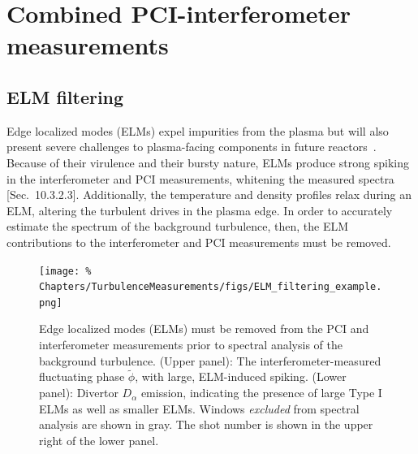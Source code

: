 \section{Combined PCI-interferometer measurements}
\label{sec:TurbulenceMeasurements:Measurements}


\subsection{ELM filtering}
\label{sec:TurbulenceMeasurements:ELM_filtering}
Edge localized modes (ELMs) expel impurities from the plasma but
will also present severe challenges to plasma-facing components
in future reactors~\cite[Sec.~7.17]{wesson}.
Because of their virulence and their bursty nature,
ELMs produce strong spiking in the interferometer and PCI measurements,
whitening the measured spectra
[Sec.~10.3.2.3]\cite{bendat_and_piersol}.
Additionally, the temperature and density profiles relax during an ELM,
altering the turbulent drives in the plasma edge.
In order to accurately estimate
the spectrum of the background turbulence, then,
the ELM contributions to the interferometer and PCI measurements
must be removed.

\begin{figure}
  \centering
  \texttt{[image: \%
    Chapters/TurbulenceMeasurements/figs/ELM\_filtering\_example.png]}
  \caption[ELM filtering]{%
    Edge localized modes (ELMs) must be removed
    from the PCI and interferometer measurements
    prior to spectral analysis of the background turbulence.
    (Upper panel): The interferometer-measured
    fluctuating phase $\tilde{\phi}$,
    with large, ELM-induced spiking.
    (Lower panel): Divertor $D_{\alpha}$ emission,
    indicating the presence of large Type I ELMs
    as well as smaller ELMs.
    Windows \emph{excluded} from spectral analysis are shown in gray.
    The \diiid\space shot number is shown in the upper right
    of the lower panel.
  }
\label{fig:TurbulenceMeasurements:ELM_filtering_example}
\end{figure}


